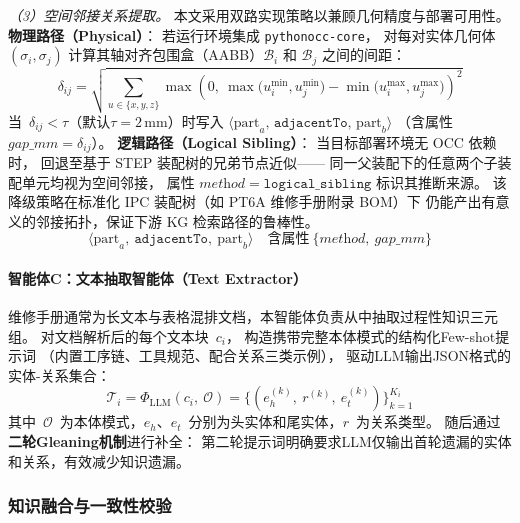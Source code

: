 \textit{（3）空间邻接关系提取。}
本文采用双路实现策略以兼顾几何精度与部署可用性。
\textbf{物理路径（Physical）}：
若运行环境集成 \texttt{pythonocc-core}，
对每对实体几何体~$(\sigma_i, \sigma_j)$
计算其轴对齐包围盒（AABB）$\mathcal{B}_i$ 和 $\mathcal{B}_j$ 之间的间距：
\begin{equation}
  \delta_{ij} =
  \sqrt{\sum_{u \in \{x,y,z\}}
    \max\!\left(0,\ \max\bigl(u_i^{\min}, u_j^{\min}\bigr)
                     - \min\bigl(u_i^{\max}, u_j^{\max}\bigr)\right)^{\!2}}
  \label{eq:gap}
\end{equation}
当~$\delta_{ij} < \tau$（默认$\tau = 2\,\text{mm}$）时写入
$\langle \text{part}_a,\,\texttt{adjacentTo},\,\text{part}_b \rangle$
（含属性 $gap\_mm = \delta_{ij}$）。
\textbf{逻辑路径（Logical Sibling）}：
当目标部署环境无 OCC 依赖时，
回退至基于 STEP 装配树的兄弟节点近似——
同一父装配下的任意两个子装配单元均视为空间邻接，
属性 $\textit{method} = \mathtt{logical\_sibling}$ 标识其推断来源。
该降级策略在标准化 IPC 装配树（如 PT6A 维修手册附录 BOM）下
仍能产出有意义的邻接拓扑，保证下游 KG 检索路径的鲁棒性。
\begin{equation}
  \langle \text{part}_a,\ \texttt{adjacentTo},\ \text{part}_b \rangle
  \quad \text{含属性}\ \{\textit{method},\ gap\_mm\}
  \label{eq:adjacent}
\end{equation}

\paragraph{智能体C：文本抽取智能体（Text Extractor）}

维修手册通常为长文本与表格混排文档，本智能体负责从中抽取过程性知识三元组。
对文档解析后的每个文本块~$c_i$，
构造携带完整本体模式的结构化Few-shot提示词
（内置工序链、工具规范、配合关系三类示例），
驱动LLM输出JSON格式的实体-关系集合：
\begin{equation}
  \mathcal{T}_i = \Phi_{\text{LLM}}(c_i,\ \mathcal{O})
                = \bigl\{(e_h^{(k)},\ r^{(k)},\ e_t^{(k)})\bigr\}_{k=1}^{K_i}
  \label{eq:llm-extract}
\end{equation}
其中~$\mathcal{O}$~为本体模式，$e_h$、$e_t$~分别为头实体和尾实体，$r$~为关系类型。
随后通过\textbf{二轮Gleaning机制}进行补全：
第二轮提示词明确要求LLM仅输出首轮遗漏的实体和关系，有效减少知识遗漏。

\subsubsection{知识融合与一致性校验}
\label{sec:kg-fusion}

